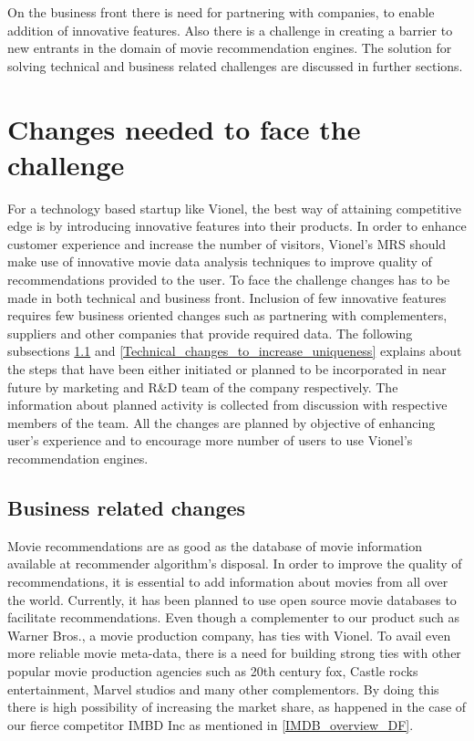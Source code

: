   On the business front there is need for partnering with companies, to enable addition of innovative features. Also there is a challenge in creating a barrier to new entrants in the domain of movie recommendation engines. The solution for solving technical and business related challenges are discussed in further sections.     

\section{Changes needed to face the challenge}
 \label{Changes_needed_to_face_the_challenge}
 For a technology based startup like Vionel, the best way of attaining competitive edge is by introducing innovative features into their products. In order to enhance customer experience and increase the number of visitors, Vionel's \acrshort{MRS} should make use of innovative movie data analysis techniques to improve quality of recommendations provided to the user. To face the challenge changes has to be made in both technical and business front. Inclusion of few innovative features requires few business oriented changes such as partnering with complementers, suppliers and other companies that provide required data. The following subsections \ref{Buisness_related_changes} and \ref{Technical_changes_to_increase_uniqueness} explains about the steps that have been either initiated or planned to be incorporated in near future by marketing and R\&D team of the company respectively. The information about planned activity is collected from discussion with respective members of the team. All the changes are planned by objective of enhancing user's experience and to encourage more number of users to use Vionel's recommendation engines.

 \subsection {Business related changes} 
  \label{Buisness_related_changes} 
    Movie recommendations are as good as the database of movie information available at recommender algorithm's disposal. In order to improve the quality of recommendations, it is essential to add information about movies from all over the world. Currently, it has been planned to use open source movie databases to facilitate recommendations. Even though a complementer to our product such as Warner Bros., a movie production company, has ties with Vionel. To avail even more reliable movie meta-data, there is a need for building strong ties with other popular movie production agencies such as 20th century fox, Castle rocks entertainment, Marvel studios and many other complementors. By doing this there is high possibility of increasing the market share, as happened in the case of our fierce competitor IMBD Inc as mentioned in \ref{IMDB_overview_DF}.     
 
